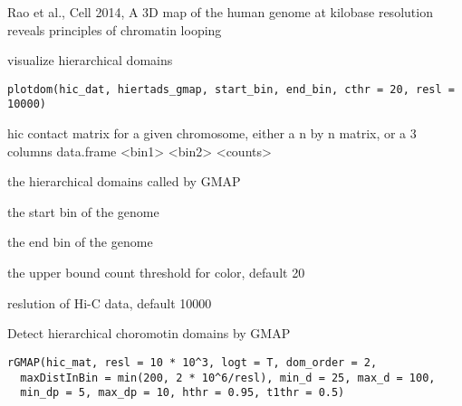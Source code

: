 \documentclass[a4paper]{book}
\begin{document}
%
\begin{Source}\relax
Rao et al., Cell 2014, A 3D map of the human genome at kilobase resolution reveals principles of chromatin looping
\end{Source}
%
\begin{Description}\relax
visualize hierarchical domains
\end{Description}
%
\begin{Usage}
\begin{verbatim}
plotdom(hic_dat, hiertads_gmap, start_bin, end_bin, cthr = 20, resl = 10000)
\end{verbatim}
\end{Usage}
%
\begin{Arguments}
\begin{ldescription}
\item[\code{hic\_dat}] hic contact matrix for a given chromosome, either a n by n matrix, or a 3 columns data.frame
<bin1> <bin2> <counts>

\item[\code{hiertads\_gmap}] the hierarchical domains called by GMAP

\item[\code{start\_bin}] the start bin of the genome

\item[\code{end\_bin}] the end bin of the genome

\item[\code{cthr}] the upper bound count threshold for color, default 20

\item[\code{resl}] reslution of Hi-C data, default 10000
\end{ldescription}
\end{Arguments}
%
\begin{Description}\relax
Detect hierarchical choromotin domains by GMAP
\end{Description}
%
\begin{Usage}
\begin{verbatim}
rGMAP(hic_mat, resl = 10 * 10^3, logt = T, dom_order = 2,
  maxDistInBin = min(200, 2 * 10^6/resl), min_d = 25, max_d = 100,
  min_dp = 5, max_dp = 10, hthr = 0.95, t1thr = 0.5)
\end{verbatim}
\end{Usage}
%
\end{document}
